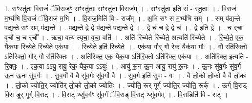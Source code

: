\documentclass[17pt]{extarticle}
\begin{document}
1. सꣳस्तु॑ता वि॒राजं॑ ॅवि॒राजꣳ॒॒ सꣳस्तु॑ताः॒ सꣳस्तु॑ता वि॒राज᳚म् । . सꣳस्तु॑ता॒ इति॒ सं - स्तु॒ताः॒ । . वि॒राज॑ म॒भ्य॑भि वि॒राजं॑ ॅवि॒राज॑ म॒भि । . वि॒राज॒मिति॑ वि - राज᳚म् । . अ॒भि सꣳ स म॒भ्य॑भि सम् । . सम् प॑द्यन्ते पद्यन्ते॒ सꣳ सम् प॑द्यन्ते । . प॒द्य॒न्ते॒ द्वे द्वे प॑द्यन्ते पद्यन्ते॒ द्वे । . द्वे च॑ च॒ द्वे द्वे च॑ । . द्वे इति॒ द्वे । . च र्‌चा॒ वृचौ॑ च॒ च र्‌चौ᳚ । . ऋचा॒ वत्य त्यृचा॒ वृचा॒ वति॑ । . अति॑ रिच्येते रिच्येते॒ अत्यति॑ रिच्येते । . रि॒च्ये॒ते॒ एक॒ यैक॑या रिच्येते रिच्येते॒ एक॑या । . रि॒च्ये॒ते॒ इति॑ रिच्येते । . एक॑या॒ गौर् गौ रेक॒ यैक॑या॒ गौः । . गौ रति॑रि॒क्तो ऽति॑रिक्तो॒ गौर् गौ रति॑रिक्तः । . अति॑रिक्त॒ एक॒ यैक॒या ऽति॑रि॒क्तो ऽति॑रिक्त॒ एक॑या । . अति॑रिक्त॒ इत्यति॑ - रि॒क्तः॒ । . एक॒या ऽऽयु॒ रायु॒ रेक॒ यैक॒या ऽऽयुः॑ । . आयु॑ रू॒न ऊ॒न आयु॒ रायु॑ रू॒नः । . ऊ॒नः सु॑व॒र्गः सु॑व॒र्ग ऊ॒न ऊ॒नः सु॑व॒र्गः । . सु॒व॒र्गो वै वै सु॑व॒र्गः सु॑व॒र्गो वै । . सु॒व॒र्ग इति॑ सुवः - गः । . वै लो॒को लो॒को वै वै लो॒कः । . लो॒को ज्योति॒र् ज्योति॑र् लो॒को लो॒को ज्योतिः॑ । . ज्योति॒ रूर् गूर्ग् ज्योति॒र् ज्योति॒ रूर्क् । . ऊर्ग् वि॒राड् वि॒रा डूर् गूर्ग् वि॒राट् । . वि॒राट् थ्सु॑व॒र्गꣳ सु॑व॒र्गं ॅवि॒राड् वि॒राट् थ्सु॑व॒र्गम् । . वि॒राडिति॑ वि - राट् । \newline
\end{document}
